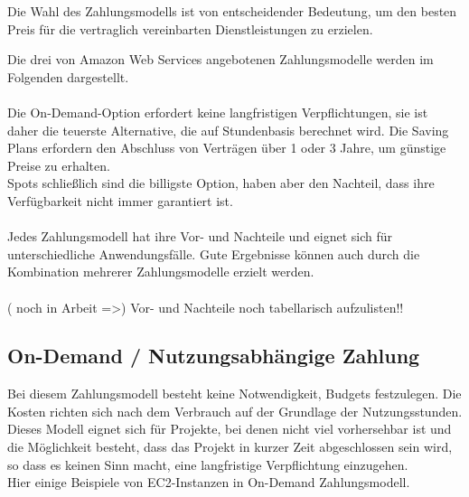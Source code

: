 Die Wahl des Zahlungsmodells ist von entscheidender Bedeutung, um den besten Preis für die vertraglich vereinbarten Dienstleistungen zu erzielen.

Die drei von Amazon Web Services angebotenen Zahlungsmodelle werden im Folgenden dargestellt.
\\\\
Die On-Demand-Option erfordert keine langfristigen Verpflichtungen, sie ist daher die teuerste Alternative, die auf Stundenbasis berechnet wird. Die Saving Plans erfordern den Abschluss von Verträgen über 1 oder 3 Jahre, um günstige Preise zu erhalten.
\\Spots schließlich sind die billigste Option, haben aber den Nachteil, dass ihre Verfügbarkeit nicht immer garantiert ist.
\\\\
Jedes Zahlungsmodell hat ihre Vor- und Nachteile und eignet sich für unterschiedliche Anwendungsfälle. Gute Ergebnisse können auch durch die Kombination mehrerer Zahlungsmodelle erzielt werden.
\\\\
( noch in Arbeit =>)
Vor- und Nachteile noch tabellarisch aufzulisten!!


\subsection{On-Demand / Nutzungsabhängige Zahlung}
Bei diesem Zahlungsmodell besteht keine Notwendigkeit, Budgets festzulegen. Die Kosten richten sich nach dem Verbrauch auf der Grundlage der Nutzungsstunden.
\\
Dieses Modell eignet sich für Projekte, bei denen nicht viel vorhersehbar ist und die Möglichkeit besteht, dass das Projekt in kurzer Zeit abgeschlossen sein wird, so dass es keinen Sinn macht, eine langfristige Verpflichtung einzugehen.
\\
Hier einige Beispiele von EC2-Instanzen in On-Demand Zahlungsmodell.

